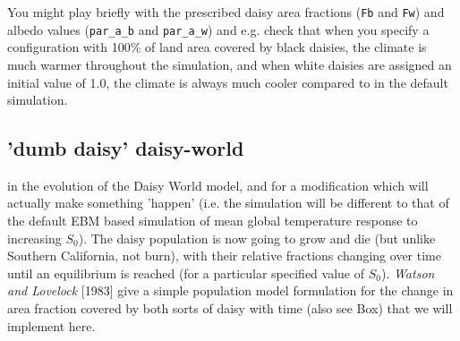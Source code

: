 \documentclass{tufte-book} %
\begin{document}
You might play briefly with the prescribed daisy area fractions (\texttt{Fb} and \texttt{Fw}) and albedo values (\texttt{par\_a\_b} and \texttt{par\_a\_w}) and e.g. check that when you specify a configuration with 100\% of land area covered by black daisies, the climate is much warmer throughout the simulation, and when white daisies are assigned an initial value of 1.0, the climate is always much cooler compared to in the default simulation.


\subsection{'dumb daisy' daisy-world}

\vspace{-2mm}
 in the evolution of the Daisy World model, and for a modification which will actually make something 'happen' (i.e. the simulation will be different to that of the default EBM based simulation of mean global temperature response to increasing \(S_{0}\)). The daisy population is now going to grow and die (but unlike Southern California, not burn), with their relative fractions  changing over time until an equilibrium is reached (for a particular specified value of \(S_{0}\)).
\textit{Watson and Lovelock} [1983] give a simple population model formulation for the change in area fraction covered by both sorts of daisy with time (also see Box) that we will implement here.
\end{document}
